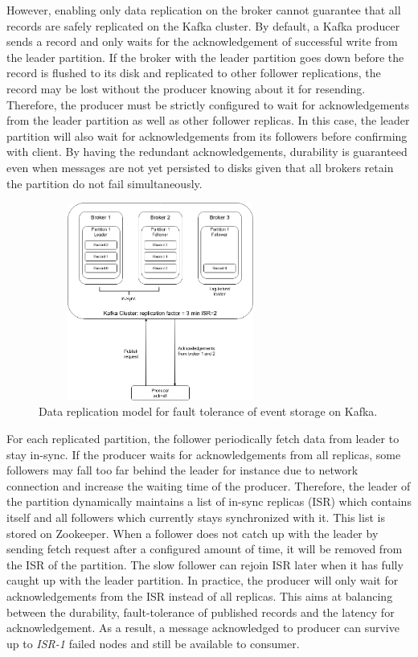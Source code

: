 However, enabling only data replication on the broker cannot guarantee that all records are safely replicated on the Kafka cluster.  By default, a Kafka producer sends a record and only waits for the acknowledgement of successful write from the leader partition. If the broker with the leader partition goes down before the record is flushed to its disk and replicated to other follower replications, the record may be lost without the producer knowing about it for resending. Therefore, the producer must be strictly configured to wait for acknowledgements from the leader partition as well as other follower replicas. In this case, the leader partition will also wait for acknowledgements from its followers before confirming with client. By having the redundant acknowledgements, durability is guaranteed even when messages are not yet persisted to disks given that all brokers retain the partition do not fail simultaneously. 
\begin{figure}[h]
	\centering
	\includegraphics[width=8cm,height=6.5cm]{images/ft-eventstorage-kafka.png}
	\caption{Data replication model for fault tolerance of event storage on Kafka.}
	\label{fig:fteventstorekafka}
\end{figure}

For each replicated partition, the follower periodically fetch data from leader to stay in-sync. If the producer waits for acknowledgements from all replicas, some followers may fall too far behind the leader for instance due to network connection and increase the waiting time of the producer. Therefore, the leader of the partition dynamically maintains a list of in-sync replicas (ISR) which contains itself and all followers which currently stays synchronized with it. This list is stored on Zookeeper. When a follower does not catch up with the leader by sending fetch request after a configured amount of time, it will be removed from the ISR of the partition. The slow follower can rejoin ISR later when it has fully caught up with the leader partition. In practice, the producer will only wait for acknowledgements from the ISR instead of all replicas. This aims at balancing between the durability, fault-tolerance of published records and the latency for acknowledgement. As a result, a message acknowledged to producer can survive up to \emph{ISR-1} failed nodes and still be available to consumer.

